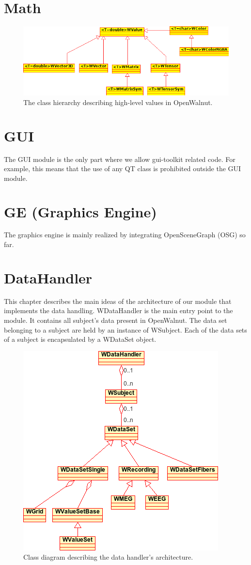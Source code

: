 \documentclass[a4paper,12pt]{scrbook}
\begin{document}
\chapter{Math}


\begin{figure}[htb]
  \includegraphics[width=\textwidth]{WValue_hierachy}
  \caption{The class hierarchy describing high-level values in OpenWalnut.}
\end{figure}

\chapter{GUI}
The GUI module is the only part where we allow gui-toolkit related code. For example, this means that the use of any QT class is
prohibited outside the GUI module.
\chapter{GE (Graphics Engine)}
The graphics engine is mainly realized by integrating OpenSceneGraph (OSG) so far.
\chapter{DataHandler}
This chapter describes the main ideas of the architecture of our module that implements the data handling. WDataHandler is the
main entry point to the module. It contains all subject's data present in OpenWalnut. The data set belonging to a subject are held by
an instance of WSubject. Each of the data sets of a subject is encapsulated by a WDataSet object. 

\begin{figure}[htb]
  \centering
  \includegraphics[width=.4\textwidth]{dataHandler_classDiagram}
  \caption{Class diagram describing the data handler's architecture.}
\end{figure}
\end{document}

